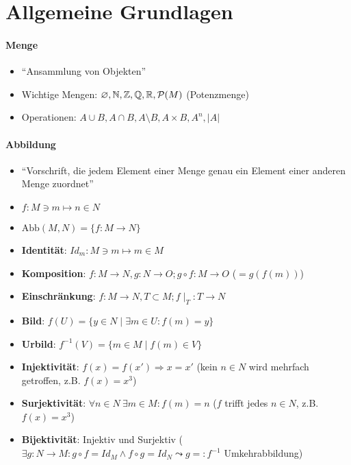 \section{\label{sec:Grundlagen}Allgemeine Grundlagen}

\paragraph{Menge}
\begin{itemize}
  \item ``Ansammlung von Objekten''
  \item Wichtige Mengen: $\varnothing, \mathbb{N}, \mathbb{Z}, \mathbb{Q}, \mathbb{R}, \mathcal{P}(M)$ (Potenzmenge)
  \item Operationen: $A\cup B, A\cap B, A\setminus B, A\times B, A^n, |A|$
\end{itemize}

\paragraph{Abbildung}
\begin{itemize}
  \item ``Vorschrift, die jedem Element einer Menge genau ein Element einer anderen Menge zuordnet''
  \item $f:  M\ni m \mapsto n \in N$
  \item $\text{Abb}(M,N) = \{ f:M\rightarrow N \}$
  \item \textbf{Identität}: $Id_m: M \ni m \mapsto m \in M$
  \item \textbf{Komposition}: $f:M\rightarrow N, g:N\rightarrow O; g\circ f: M\rightarrow O$ ($=g(f(m))$)
  \item \textbf{Einschränkung}: $f:M\rightarrow N, T\subset M; f\mid_T:T\rightarrow N$
  \item \textbf{Bild}: $f(U)=\{ y \in N \mid \exists m \in U: f(m)=y \}$
  \item \textbf{Urbild}: $f^{-1}(V)= \{ m \in M \mid f(m) \in V \}$
  \item \textbf{Injektivität}: $f(x)=f(x') \Rightarrow x=x'$ (kein $n \in N$ wird mehrfach getroffen, z.B. $f(x)=x^3$)
  \item \textbf{Surjektivität}: $\forall n \in N \ \exists m \in M: f(m)=n$ ($f$ trifft jedes $n \in N$, z.B. $f(x)=x^3$)
  \item \textbf{Bijektivität}: Injektiv und Surjektiv ($\exists g:N \rightarrow M: g \circ f = Id_M \wedge f \circ g = Id_N \leadsto g=:f^{-1}$ Umkehrabbildung)
\end{itemize}


